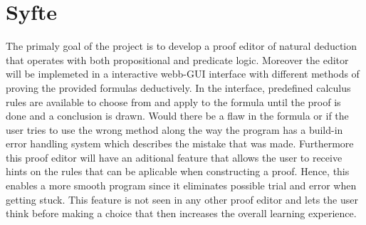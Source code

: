 \section{Syfte}
The primaly goal of the project is to develop a proof editor of natural deduction
that operates with both propositional and predicate logic. Moreover the editor will
be implemeted in a interactive webb-GUI interface with different methods of proving the
provided formulas deductively. In the interface, predefined calculus rules are available
to choose from and apply to the formula until the proof is done and a conclusion is drawn.
Would there be a flaw in the formula or if the user tries to use the wrong method along
the way the program has a build-in error handling system which describes the mistake
that was made. Furthermore this proof editor will have an aditional feature that allows the
user to receive hints on the rules that can be aplicable when constructing a proof. Hence,
this enables a more smooth program since it eliminates possible trial and error when
getting stuck. This feature is not seen in any other proof editor and lets the user
think before making a choice that then increases the overall learning experience.
